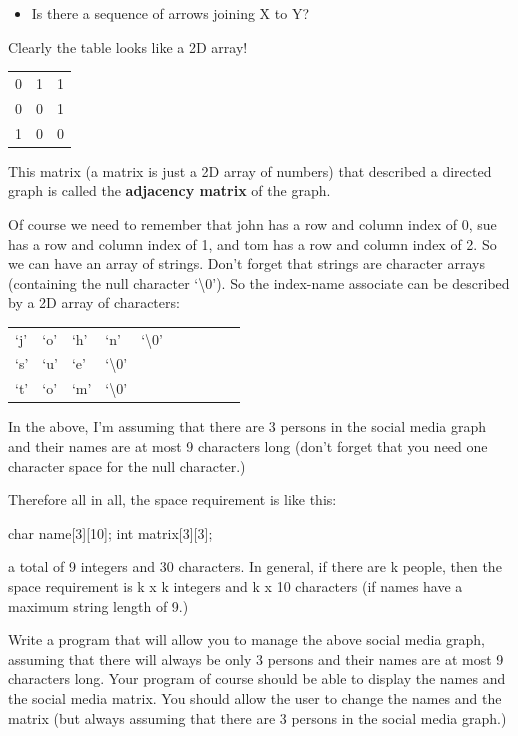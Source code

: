 \begin{itemize}
\item
  Is there a sequence of arrows joining X to Y?
\end{itemize}

Clearly the table looks like a 2D array!

\begin{tabular}{lll}
0 & 1 & 1 \\
0 & 0 & 1 \\
1 & 0 & 0 \\
\end{tabular}

This matrix (a matrix is just a 2D array of numbers) that described a
directed graph is called the \textbf{adjacency matrix} of the graph.

Of course we need to remember that john has a row and column index of 0,
sue has a row and column index of 1, and tom has a row and column index
of 2. So we can have an array of strings. Don't forget that strings are
character arrays (containing the null character `\textbackslash 0'). So
the index-name associate can be described by a 2D array of characters:

\begin{tabular}{llllllllll}
`j' & `o' & `h' & `n' & `\textbackslash 0' & & & & & \\
`s' & `u' & `e' & `\textbackslash 0' & & & & & & \\
`t' & `o' & `m' & `\textbackslash 0' & & & & & & \\
\end{tabular}

In the above, I'm assuming that there are 3 persons in the social media
graph and their names are at most 9 characters long (don't forget that
you need one character space for the null character.)

Therefore all in all, the space requirement is like this:

\begin{consolethree}[escapeinside=||]
char name[3][10];
int matrix[3][3];
\end{consolethree}

a total of 9 integers and 30 characters. In general, if there are k
people, then the space requirement is k x k integers and k x 10
characters (if names have a maximum string length of 9.)

\begin{ex}
Write a program that will allow you to manage the
above social media graph, assuming that there will always be only 3
persons and their names are at most 9 characters long. Your program of
course should be able to display the names and the social media matrix.
You should allow the user to change the names and the matrix (but always
assuming that there are 3 persons in the social media graph.)
\end{ex}

